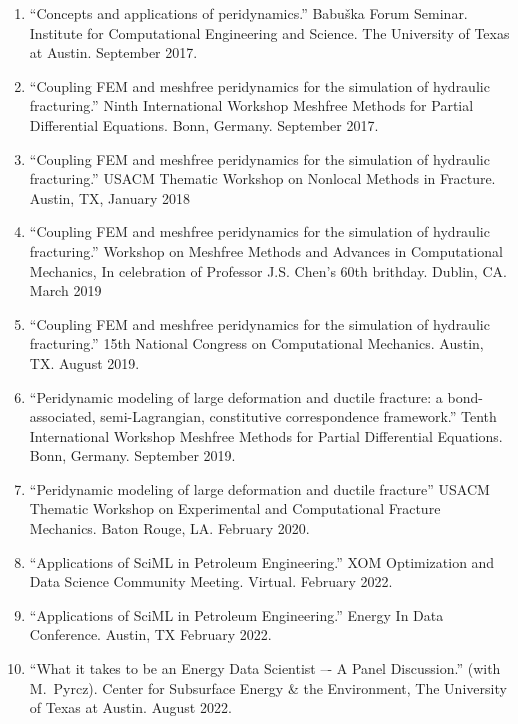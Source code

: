 \begin{enumerate}[resume]
    \item ``Concepts and applications of peridynamics.'' Babu\v{s}ka Forum Seminar. Institute for Computational Engineering and Science. The University of Texas at Austin. September 2017.
    \item ``Coupling FEM and meshfree peridynamics for the simulation of hydraulic fracturing.'' Ninth International Workshop Meshfree Methods for Partial Differential Equations. Bonn, Germany. September 2017.
    \item ``Coupling FEM and meshfree peridynamics for the simulation of hydraulic fracturing.'' USACM Thematic Workshop on Nonlocal Methods in Fracture.  Austin, TX, January 2018
    \item ``Coupling FEM and meshfree peridynamics for the simulation of hydraulic fracturing.'' Workshop on Meshfree Methods and Advances in Computational Mechanics, In celebration of Professor J.S. Chen's 60th brithday.  Dublin, CA.  March 2019
    \item ``Coupling FEM and meshfree peridynamics for the simulation of hydraulic fracturing.'' 15th National Congress on Computational Mechanics. Austin, TX. August 2019.
    \item ``Peridynamic modeling of large deformation and ductile fracture: a bond-associated, semi-Lagrangian, constitutive correspondence framework.'' Tenth International Workshop Meshfree Methods for Partial Differential Equations. Bonn, Germany. September 2019.
    \item ``Peridynamic modeling of large deformation and ductile fracture'' USACM Thematic Workshop on Experimental and Computational Fracture Mechanics. Baton Rouge, LA. February 2020.
    \item ``Applications of SciML in Petroleum Engineering.'' XOM Optimization and Data Science Community Meeting.  Virtual. February 2022.
    \item ``Applications of SciML in Petroleum Engineering.'' Energy In Data Conference. Austin, TX February 2022.
    \item ``What it takes to be an Energy Data Scientist –- A Panel Discussion.'' (with M.\ Pyrcz). Center for Subsurface Energy \& the Environment, The University of Texas at Austin.  August 2022.
\end{enumerate}
\else
%
\ifdefined\ispdf
